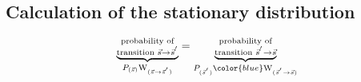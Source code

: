 \subsection{Calculation of the stationary distribution}

\begin{frame}{\subsecname}

\svspace{-5mm}



\begin{equation}
	\underbrace{ \substack{	\text{probability of} \\
				\text{transition } 
				\vec{s} \rightarrow \vec{s}^{'}} }_{
			P_{(\vec{s})} \mathrm{W}_{(\vec{s} \rightarrow
				\vec{s}^{'})} }
	 = 
	\underbrace{ \substack{	\text{probability of} \\
				\text{transition } 
				\vec{s}^{'} \rightarrow \vec{s} } }_{
			P_{(\vec{s}^{'})} 
			{\color{blue}
			\mathrm{W}_{(\vec{s}^{'} \rightarrow
				\vec{s})}} }
\end{equation}
\begin{align}

\end{align}
\end{frame}
